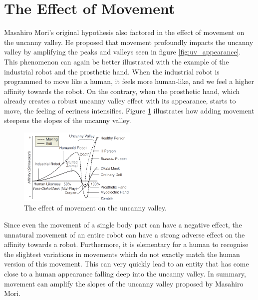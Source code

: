 \section{The Effect of Movement}
Masahiro Mori's original hypothesis \cite{original_masahiro} also factored in the effect of movement on the uncanny valley. He proposed that movement profoundly impacts the uncanny valley by amplifying the peaks and valleys seen in figure \ref{fig:uv_appearance}. This phenomenon can again be better illustrated with the example of the industrial robot and the prosthetic hand. When the industrial robot is programmed to move like a human, it feels more human-like, and we feel a higher affinity towards the robot. On the contrary, when the prosthetic hand, which already creates a robust uncanny valley effect with its appearance, starts to move, the feeling of eeriness intensifies.
Figure \ref{fig:uv_movement} illustrates how adding movement steepens the slopes of the uncanny valley.
\begin{figure} %
    \centering
    \includegraphics[width=0.5\textwidth]{graphics/uv_movement.png}
    \caption{The effect of movement on the uncanny valley.}
    \label{fig:uv_movement}
\end{figure}
Since even the movement of a single body part can have a negative effect, the unnatural movement of an entire robot can have a strong adverse effect on the affinity towards a robot. Furthermore, it is elementary for a human to recognise the slightest variations in movements which do not exactly match the human version of this movement. This can very quickly lead to an entity that has come close to a human appearance falling deep into the uncanny valley. In summary, movement can amplify the slopes of the uncanny valley proposed by Masahiro Mori.
